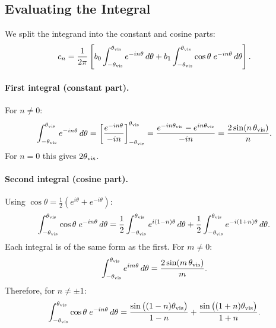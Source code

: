 \documentclass[preprint]{aastex702}
\begin{document}
\subsection{Evaluating the Integral}

We split the integrand into the constant and cosine parts:
\begin{equation}
    c_n = \frac{1}{2\pi}\left[b_0\int_{-\theta_{\rm vis}}^{\theta_{\rm vis}} e^{-in\theta}\, d\theta + b_1\int_{-\theta_{\rm vis}}^{\theta_{\rm vis}} \cos\theta\; e^{-in\theta}\, d\theta\right].
    \label{eq:cn_split}
\end{equation}

\paragraph{First integral (constant part).}
For $n \neq 0$:
\begin{equation}
    \int_{-\theta_{\rm vis}}^{\theta_{\rm vis}} e^{-in\theta}\, d\theta = \left[\frac{e^{-in\theta}}{-in}\right]_{-\theta_{\rm vis}}^{\theta_{\rm vis}} = \frac{e^{-in\theta_{\rm vis}} - e^{in\theta_{\rm vis}}}{-in} = \frac{2\sin(n\,\theta_{\rm vis})}{n}.
    \label{eq:cn_int_const}
\end{equation}
For $n = 0$ this gives $2\theta_{\rm vis}$.

\paragraph{Second integral (cosine part).}
Using $\cos\theta = \tfrac{1}{2}(e^{i\theta} + e^{-i\theta})$:
\begin{equation}
    \int_{-\theta_{\rm vis}}^{\theta_{\rm vis}} \cos\theta\; e^{-in\theta}\, d\theta = \frac{1}{2}\int_{-\theta_{\rm vis}}^{\theta_{\rm vis}} e^{i(1-n)\theta}\, d\theta + \frac{1}{2}\int_{-\theta_{\rm vis}}^{\theta_{\rm vis}} e^{-i(1+n)\theta}\, d\theta.
\end{equation}
Each integral is of the same form as the first. For $m \neq 0$:
\begin{equation}
    \int_{-\theta_{\rm vis}}^{\theta_{\rm vis}} e^{im\theta}\, d\theta = \frac{2\sin(m\,\theta_{\rm vis})}{m}.
\end{equation}
Therefore, for $n \neq \pm 1$:
\begin{equation}
    \int_{-\theta_{\rm vis}}^{\theta_{\rm vis}} \cos\theta\; e^{-in\theta}\, d\theta = \frac{\sin\big((1-n)\theta_{\rm vis}\big)}{1-n} + \frac{\sin\big((1+n)\theta_{\rm vis}\big)}{1+n}.
    \label{eq:cn_int_cos}
\end{equation}
\end{document}
